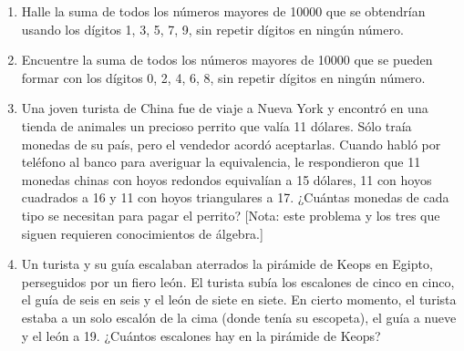 \begin{Ejer}
\begin{enumerate}


\item Halle la suma de todos los n\'umeros mayores de 10000 que se obtendr\'ian usando los d\'igitos 1, 3, 5, 7, 9, sin repetir d\'igitos en ning\'un n\'umero.

\item Encuentre la suma de todos los n\'umeros mayores de 10000 que se pueden formar con los d\'igitos 0, 2, 4, 6, 8, sin repetir d\'igitos en ning\'un n\'umero.

\item Una joven turista de China fue de viaje a Nueva York y encontr\'o en una tienda de animales un precioso perrito que val\'ia 11 d\'olares. S\'olo tra\'ia monedas de su pa\'is, pero el vendedor acord\'o aceptarlas. Cuando habl\'o por tel\'efono al banco para averiguar la equivalencia, le respondieron que 11 monedas chinas con hoyos redondos equival\'ian a 15 d\'olares, 11 con hoyos cuadrados a 16 y 11 con hoyos triangulares a 17. ¿Cu\'antas monedas de cada tipo se necesitan para pagar el perrito? [Nota: este problema y los tres que siguen requieren conocimientos de \'algebra.]


\item Un turista y su gu\'ia escalaban aterrados la pir\'amide de Keops en Egipto, perseguidos por un fiero le\'on. El turista sub\'ia los escalones de cinco en cinco, el gu\'ia de seis en seis y el le\'on de siete en siete. En cierto momento, el turista estaba a un solo escal\'on de la cima (donde ten\'ia su escopeta), el gu\'ia a nueve y el le\'on a 19. ¿Cu\'antos escalones hay en la pir\'amide de Keops?


\end{enumerate}
\end{Ejer}

